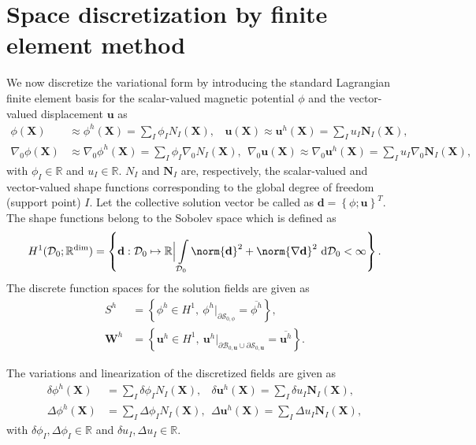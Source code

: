 \documentclass[11pt,a4paper,final]{article}
\begin{document}
\section{Space discretization by finite element method}
We now discretize the variational form  by introducing the standard Lagrangian finite element basis for the scalar-valued magnetic potential $\phi$ and the vector-valued displacement $\mathbf{u}$ as
\begin{align}
\phi (\mathbf{X}) &\approx \phi^h (\mathbf{X}) = \sum\limits_{I} \phi_I N_I (\mathbf{X}), \ \ \ \ \mathbf{u} (\mathbf{X}) \approx \mathbf{u}^h (\mathbf{X}) = \sum\limits_{I} u_I \mathbf{N}_I (\mathbf{X}), \\
\nabla_0 \phi (\mathbf{X}) &\approx \nabla_0 \phi^h (\mathbf{X}) = \sum\limits_{I} \phi_I \nabla_0 N_I (\mathbf{X}), \ \ \nabla_0 \mathbf{u} (\mathbf{X}) \approx \nabla_0 \mathbf{u}^h (\mathbf{X}) = \sum\limits_{I} u_I \nabla_0 \mathbf{N}_I (\mathbf{X}),
\end{align}
with $\phi_I \in \mathbb{R}$ and $u_I \in \mathbb{R}$. $N_I$ and $\mathbf{N}_I$ are, respectively, the scalar-valued and vector-valued shape functions corresponding to the global degree of freedom (support point) $I$. Let the collective solution vector be called as $\mathbf{d} = \left\lbrace \phi; \mathbf{u} \right\rbrace^T$. The shape functions belong to the Sobolev space which is defined as
\begin{equation}
H^1 (\mathcal{D}_0; \mathbb{R}^{\text{dim}}) = \left\lbrace \mathbf{d} : \mathcal{D}_0 \mapsto \mathbb{R} \Big{|} \int\limits_{\mathcal{D}_0} \norm{\mathbf{d}}^2 + \norm{\nabla \mathbf{d}}^2 \ \mathrm{d}\mathcal{D}_0 < \infty \right\rbrace.
\end{equation}
The discrete function spaces for the solution fields are given as
\begin{align}
S^h &= \left\lbrace \phi^h \in H^1, \ \phi^h|_{\partial \mathcal{S}_{0, \phi}} = \overline{\phi^h} \right\rbrace, \\
\mathbf{W}^h &= \left\lbrace \mathbf{u}^h \in H^1, \ \mathbf{u}^h|_{\partial \mathcal{B}_{0, \mathbf{u}} \cup \partial \mathcal{S}_{0, \mathbf{u}}} = \overline{\mathbf{u}^h} \right\rbrace.
\end{align}

\noindent The variations and linearization of the discretized fields are given as
\begin{align}
\delta \phi^h (\mathbf{X}) &= \sum\limits_{I} \delta \phi_I N_I (\mathbf{X}), \ \ \ \ \delta  \mathbf{u}^h (\mathbf{X}) = \sum\limits_{I} \delta u_I \mathbf{N}_I (\mathbf{X}), \\
\Delta \phi^h (\mathbf{X}) &= \sum\limits_{I} \Delta \phi_I N_I (\mathbf{X}), \ \ \Delta \mathbf{u}^h (\mathbf{X}) = \sum\limits_{I} \Delta u_I \mathbf{N}_I (\mathbf{X}),
\end{align}
with $\delta \phi_I, \Delta \phi_I \in \mathbb{R}$ and $\delta u_I, \Delta u_I \in \mathbb{R}$. \par 
\end{document}
